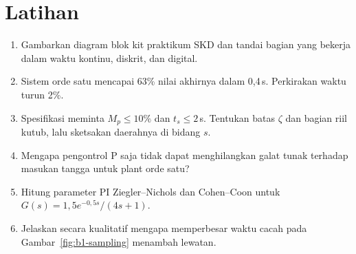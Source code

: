 \section*{Latihan}
\begin{enumerate}
	\item Gambarkan diagram blok kit praktikum SKD dan tandai bagian yang bekerja dalam waktu kontinu, diskrit, dan digital.
	\item Sistem orde satu mencapai 63\% nilai akhirnya dalam 0,4\,s. Perkirakan waktu turun 2\%.
	\item Spesifikasi meminta $M_p \le 10\%$ dan $t_s \le 2$\,s. Tentukan batas $\zeta$ dan bagian riil kutub, lalu sketsakan daerahnya di bidang $s$.
	\item Mengapa pengontrol P saja tidak dapat menghilangkan galat tunak terhadap masukan tangga untuk plant orde satu?
	\item Hitung parameter PI Ziegler--Nichols dan Cohen--Coon untuk $G(s) = 1{,}5e^{-0{,}5s}/(4s+1)$.
	\item Jelaskan secara kualitatif mengapa memperbesar waktu cacah pada Gambar~\ref{fig:b1-sampling} menambah lewatan.
\end{enumerate}
